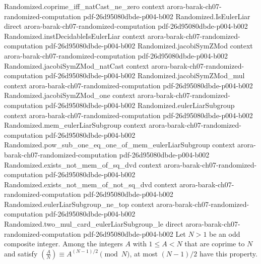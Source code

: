 \begin{theorem}
\label{Randomized.two_mul_card_filter_isEulerLiar_le}
\leanok
{}
\proofstep
  {Randomized.coprime_iff_natCast_ne_zero}
  {context}
  {arora-barak-ch07-randomized-computation}
  {pdf-26d95080dbde-p004-b002}
\proofstep
  {Randomized.IsEulerLiar}
  {direct}
  {arora-barak-ch07-randomized-computation}
  {pdf-26d95080dbde-p004-b002}
\proofstep
  {Randomized.instDecidableIsEulerLiar}
  {context}
  {arora-barak-ch07-randomized-computation}
  {pdf-26d95080dbde-p004-b002}
\proofstep
  {Randomized.jacobiSymZMod}
  {context}
  {arora-barak-ch07-randomized-computation}
  {pdf-26d95080dbde-p004-b002}
\proofstep
  {Randomized.jacobiSymZMod_natCast}
  {context}
  {arora-barak-ch07-randomized-computation}
  {pdf-26d95080dbde-p004-b002}
\proofstep
  {Randomized.jacobiSymZMod_mul}
  {context}
  {arora-barak-ch07-randomized-computation}
  {pdf-26d95080dbde-p004-b002}
\proofstep
  {Randomized.jacobiSymZMod_one}
  {context}
  {arora-barak-ch07-randomized-computation}
  {pdf-26d95080dbde-p004-b002}
\proofstep
  {Randomized.eulerLiarSubgroup}
  {context}
  {arora-barak-ch07-randomized-computation}
  {pdf-26d95080dbde-p004-b002}
\proofstep
  {Randomized.mem_eulerLiarSubgroup}
  {context}
  {arora-barak-ch07-randomized-computation}
  {pdf-26d95080dbde-p004-b002}
\proofstep
  {Randomized.pow_sub_one_eq_one_of_mem_eulerLiarSubgroup}
  {context}
  {arora-barak-ch07-randomized-computation}
  {pdf-26d95080dbde-p004-b002}
\proofstep
  {Randomized.exists_not_mem_of_sq_dvd}
  {context}
  {arora-barak-ch07-randomized-computation}
  {pdf-26d95080dbde-p004-b002}
\proofstep
  {Randomized.exists_not_mem_of_not_sq_dvd}
  {context}
  {arora-barak-ch07-randomized-computation}
  {pdf-26d95080dbde-p004-b002}
\proofstep
  {Randomized.eulerLiarSubgroup_ne_top}
  {context}
  {arora-barak-ch07-randomized-computation}
  {pdf-26d95080dbde-p004-b002}
\proofstep
  {Randomized.two_mul_card_eulerLiarSubgroup_le}
  {direct}
  {arora-barak-ch07-randomized-computation}
  {pdf-26d95080dbde-p004-b002}
Let $N>1$ be an odd composite integer. Among the integers $A$ with $1\le A<N$ that are
coprime to $N$ and satisfy $\left(\frac{A}{N}\right)\equiv A^{(N-1)/2}\pmod N$, at most
$(N-1)/2$ have this property.
\end{theorem}

